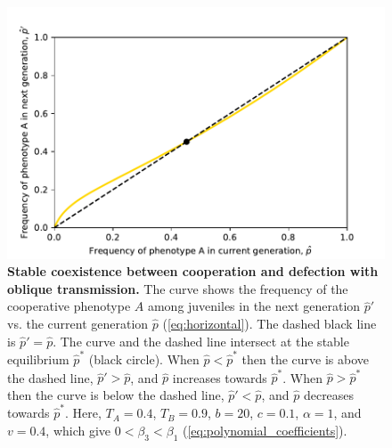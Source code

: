 \documentclass[12pt]{extarticle}
\begin{document}
{%
\begin{figure}[htb]
  \centering
  \includegraphics{coexistence_with_oblique.pdf}
  \caption{\textbf{Stable coexistence between cooperation and defection with oblique transmission.}
  The curve shows the frequency of the cooperative phenotype $A$ among juveniles in the next generation $\hat{p}'$ vs. the current generation $\hat{p}$ (\autoref{eq:horizontal}).
  The dashed black line is $\hat{p}'=\hat{p}$.
  The curve and the dashed line intersect at the stable equilibrium $\hat{p}^*$ (black circle).
  When $\hat{p} < \hat{p}^*$ then the curve is above the dashed line, $\hat{p}' > \hat{p}$, and $\hat{p}$ increases towards $\hat{p}^*$.
  When $\hat{p} > \hat{p}^*$ then the curve is below the dashed line, $\hat{p}' < \hat{p}$, and $\hat{p}$ decreases towards $\hat{p}^*$.
  Here,  $T_A = 0.4$, $T_B = 0.9$, $b = 20$, $c=0.1$, $\alpha = 1$, and $v=0.4$, which give $0<\beta_3<\beta_1$ (\autoref{eq:polynomial_coefficients}).
  }
  \label{fig:coexistence_with_oblique}
  \end{figure}

}
\end{document}
